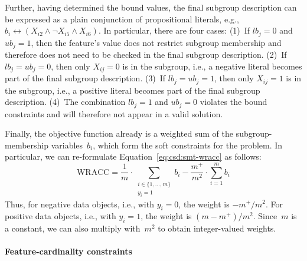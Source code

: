 \documentclass{article}
\theoremstyle{definition}
\begin{document}
Further, having determined the bound values, the final subgroup description can be expressed as a plain conjunction of propositional literals, e.g., $b_i \leftrightarrow \left( X_{i2} \land \lnot X_{i5} \land X_{i6} \right)$.
In particular, there are four cases:
(1)~If $\mathit{lb}_j = 0$ and $\mathit{ub}_j = 1$, then the feature's value does not restrict subgroup membership and therefore does not need to be checked in the final subgroup description.
(2)~If $\mathit{lb}_j = \mathit{ub}_j = 0$, then only $X_{ij} = 0$ is in the subgroup, i.e., a negative literal becomes part of the final subgroup description.
(3)~If $\mathit{lb}_j = \mathit{ub}_j = 1$, then only $X_{ij} = 1$ is in the subgroup, i.e., a positive literal becomes part of the final subgroup description.
(4)~The combination $\mathit{lb}_j = 1$ and $\mathit{ub}_j = 0$ violates the bound constraints and will therefore not appear in a valid solution.

Finally, the objective function already is a weighted sum of the subgroup-membership variables~$b_i$, which form the soft constraints for the problem.
In particular, we can re-formulate Equation~\ref{eq:csd:smt-wracc} as follows:
%
\begin{equation}
	\text{WRACC} = \frac{1}{m} \cdot \sum_{\substack{i \in \{1, \dots, m\} \\ y_i = 1 }} b_i - \frac{m^+}{m^2} \cdot \sum_{i=1}^{m} b_i
	\label{eq:csd:maxsat-wracc}
\end{equation}
%
Thus, for negative data objects, i.e., with $y_i = 0$, the weight is $-m^+ / m^2$.
For positive data objects, i.e., with $y_i = 1$, the weight is $(m - m^+) / m^2$.
Since~$m$ is a constant, we can also multiply with~$m^2$ to obtain integer-valued weights.

\paragraph{Feature-cardinality constraints}
\end{document}
